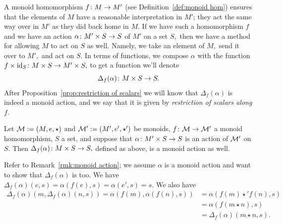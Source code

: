 \documentclass[../main/CT4S-EN-RU]{subfiles}
\begin{document}

\subsubsection{}

\begin{blockENG}
A monoid homomorphism $f\colon M\rightarrow M'$ (see Definition~\ref{def:monoid hom}) ensures that the elements of $M$ have a reasonable interpretation in $M'$; they act the same way over in $M'$ as they did back home in $M.$ If we have such a homomorphism $f$ and we have an action $\alpha\colon M'\times S\rightarrow S$ of $M'$ on a set $S,$ then we have a method for allowing $M$ to act on $S$ as well. Namely, we take an element of $M,$ send it over to $M',$ and act on $S.$ In terms of functions, we compose $\alpha$ with the function $f\times\operatorname{id}_S\colon M\times S\rightarrow M'\times S,$ to get a function we'll denote $$\Delta_f(\alpha)\colon M\times S\rightarrow S.$$ After Proposition~\ref{prop:restriction of scalars} we will know that $\Delta_f(\alpha)$ is indeed a monoid action, and we say that it is given by {\em restriction of scalars along $f$}.
\end{blockENG}

\begin{blockRUS}
\end{blockRUS}

\begin{propositionENG}\label{prop:restriction of scalars}
Let $\mathcal{M}:=(M,e,\star)$ and $\mathcal{M}':=(M',e',\star')$ be monoids, $f\colon\mathcal{M}\rightarrow\mathcal{M}'$ a monoid homomorphism, $S$ a set, and suppose that $\alpha\colon M'\times S\rightarrow S$ is an action of $\mathcal{M}'$ on $S.$ Then $\Delta_f(\alpha)\colon M\times S\rightarrow S,$ defined as above, is a monoid action as well.
\end{propositionENG}

\begin{propositionRUS}\label{prop:restriction of scalars}
\end{propositionRUS}

\begin{proofENG}
Refer to Remark~\ref{rmk:monoid action}; we assume $\alpha$ is a monoid action and want to show that $\Delta_f(\alpha)$ is too. We have $\Delta_f(\alpha)(e,s)=\alpha(f(e),s)=\alpha(e',s)=s.$ We also have
\begin{align*}
\Delta_f(\alpha)(m,\Delta_f(\alpha)(n,s))=\alpha(f(m),\alpha(f(n),s))&=\alpha(f(m)\star' f(n),s)\\
&=\alpha(f(m\star n),s)\\
&=\Delta_f(\alpha)(m\star n,s).
\end{align*}
\end{proofENG}
\end{document}
